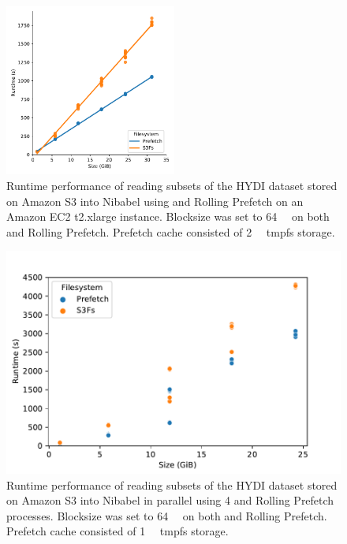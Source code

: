 \documentclass[conference]{IEEEtran}
\begin{document}


\begin{figure}
\begin{center}
\includegraphics[height=160pt]{figures/filesize.pdf}
\setlength{\abovecaptionskip}{0pt}
\setlength{\belowcaptionskip}{-10pt}
\caption{Runtime performance of reading subsets of the HYDI dataset stored on Amazon S3 into Nibabel using \sfs and Rolling Prefetch on an Amazon EC2 t2.xlarge instance. Blocksize was set to \SI{64}{\mebi\byte} on both \sfs and
Rolling Prefetch. Prefetch cache consisted of \SI{2}{\gibi\byte} tmpfs storage.}
\label{fig:filesize}
\end{center}
\end{figure}

\begin{figure}
\begin{center}
\includegraphics[width=\columnwidth]{figures/parallel.pdf}
\setlength{\abovecaptionskip}{-10pt}
\setlength{\belowcaptionskip}{-10pt}
\caption{Runtime performance of reading subsets of the HYDI dataset stored on Amazon S3 into Nibabel in parallel using 4
\sfs and Rolling Prefetch processes. Blocksize was set to \SI{64}{\mebi\byte} on both \sfs and Rolling Prefetch.
Prefetch cache consisted of \SI{1}{\gibi\byte} tmpfs storage.}
\label{fig:parallel}
\end{center}
\end{figure}
\end{document}
